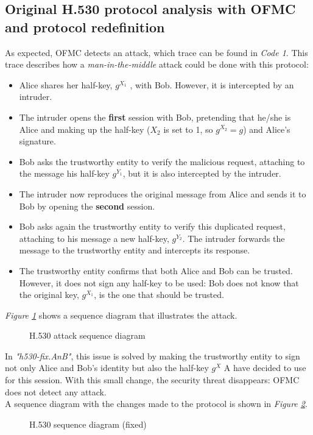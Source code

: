 \subsection{Original H.530 protocol analysis with OFMC and protocol redefinition}\label{subsec:h5302}
As expected, OFMC \cite{sebmod2005} detects an attack, which trace can be found in \textit{Code 1}. This trace describes how a \textit{man-in-the-middle} attack could be done with this protocol:
\begin{itemize}
	\item	Alice shares her half-key, $g^{X_1}$ , with Bob. However, it is intercepted by an intruder.
	\item	The intruder opens the \textbf{first} session with Bob, pretending that he/she is Alice and making up the half-key ($X_2$ is set to 1, so $g^{X_2}=g$) and Alice's signature.
	\item	Bob asks the trustworthy entity to verify the malicious request, attaching to the message his half-key $g^{Y_1}$, but it is also intercepted by the intruder.
	\item	The intruder now reproduces the original message from Alice and sends it to Bob by opening the \textbf{second} session.
	\item	Bob asks again the trustworthy entity to verify this duplicated request, attaching to his message a new half-key, $g^{Y_2}$. The intruder forwards the message to the trustworthy entity and intercepts its response.
	\item	The trustworthy entity confirms that both Alice and Bob can be trusted. However, it does not sign any half-key to be used: Bob does not know that the original key, $g^{X_1}$, is the one that should be trusted.
\end{itemize}
\textit{Figure \ref{fig:h530traceattack}} shows a sequence diagram that illustrates the attack.\\
\begin{figure}[ht!]
	\centering	
	
	\caption{H.530 attack sequence diagram}
	\label{fig:h530traceattack}
\end{figure}
In \textit{"h530-fix.AnB"}, this issue is solved by making the trustworthy entity to sign not only Alice and Bob's identity but also the half-key $g^{X}$ A have decided to use for this session. With this small change, the security threat disappears: OFMC does not detect any attack.\\
A sequence diagram with the changes made to the protocol is shown in \textit{Figure \ref{fig:h530tracefix}}.
\begin{figure}[ht!]
	\centering	
	
	\caption{H.530 sequence diagram (fixed)}
	\label{fig:h530tracefix}
\end{figure}
